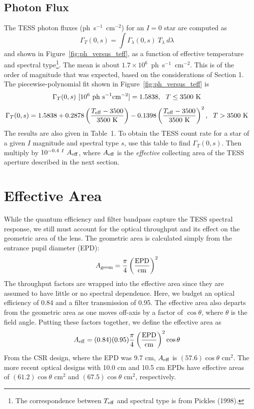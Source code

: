 \documentclass[preprint,10pt]{aastex}
\newcommand{\be}{\begin{displaymath}}
\newcommand{\ee}{\end{displaymath}}
\begin{document}
\subsection{Photon Flux}
\label{sec:results}
The TESS photon fluxes (ph~s$^{-1}$~cm$^{-2}$) for an $I=0$ star are
computed as
\be
\Gamma_T(0,s) = \int \Gamma_\lambda(0,s)~T_\lambda~d\lambda
\ee
and shown in Figure~\ref{fig:ph_versus_teff}, as a function of 
effective temperature and spectral type\footnote{The correspondence
between $T_{\rm eff}$ and spectral type is from Pickles (1998).}. The mean is about $1.7\times
10^6$~ph~s$^{-1}$~cm$^{-2}$. This is of the order of magnitude
that was expected, based on the considerations of Section 1.
The piecewise-polynomial fit shown in Figure~\ref{fig:ph_versus_teff} is
\be
\Gamma_T(0,s)~[10^6~{\rm ph~s}^{-1}{\rm cm}^{-2}] = 1.5838, ~~ T \le 3500~{\rm K} 
\ee
\be
\Gamma_T(0,s) = 1.5838 + 
0.2878 \left( \frac{T_{\rm eff} - 3500}{3500~{\rm K}} \right)
-0.1398 \left( \frac{T_{\rm eff} - 3500}{3500~{\rm K}} \right)^2, ~~ T > 3500~{\rm K}
\ee
The results are also given in Table~1.  To obtain the TESS count rate
for a star of a given $I$ magnitude and spectral type $s$, use this
table to find $\Gamma_T(0,s)$.  Then multiply by $10^{-0.4~I}~A_{\rm
  eff}$, where $A_{\rm eff}$ is the {\it effective} collecting area
of the TESS aperture described in the next section.

\section{Effective Area}
\label{sec:aeff}
While the quantum efficiency and filter bandpass capture the TESS spectral response, 
we still must account for the optical throughput and its effect on the geometric area of the lens. 
The geometric area is calculated simply from the entrance pupil diameter (EPD):
\be
A_{\rm geom} = \frac{\pi}{4} \left( \frac{\rm EPD} {\rm cm} \right )^2
\ee
The throughput factors are wrapped into the effective area since they are assumed to have little or no spectral dependence. 
Here, we budget an optical efficiency of 0.84 and a filter transmission of 0.95.
The effective area also departs from the geometric area as one moves off-axis by a factor of $\cos\theta$, 
where $\theta$ is the field angle. Putting these factors together, we define the effective area as
\be
A_{\rm eff} = (0.84)(0.95) \frac{\pi}{4} \left( \frac{\rm EPD} {\rm cm} \right )^2 \cos\theta
\ee
From the CSR design, where the EPD was 9.7 cm, $A_{\rm eff}$ is $(57.6)\cos\theta$ cm$^2$. The more recent optical designs with 10.0 cm and 10.5 cm EPDs have effective areas of $(61.2)\cos\theta$ cm$^2$ and $(67.5)\cos\theta$ cm$^2$, respectively.
\end{document}
